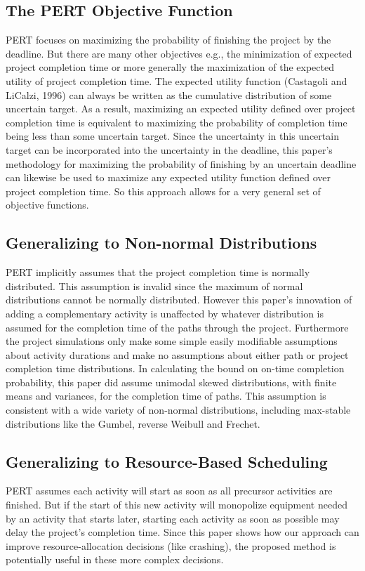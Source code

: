 \documentclass[11pt]{article}
\begin{document}
\subsection{The PERT Objective Function}
PERT focuses on maximizing the probability of finishing the project by the deadline.  But there are many other objectives e.g., the minimization of expected project completion time or more generally the maximization of the expected utility of project completion time.  The expected utility function (Castagoli and LiCalzi, 1996) can always be written as the cumulative distribution of some uncertain target.  As a result, maximizing an expected utility defined over project completion time is equivalent to maximizing the probability of completion time being less than some uncertain target.  Since the uncertainty in this uncertain target can be incorporated into the uncertainty in the deadline,  this paper's methodology for maximizing the probability of finishing by an uncertain deadline can likewise be used to maximize any expected utility function defined over project completion time.  So this approach allows for a very general set of objective functions.
\subsection{Generalizing to Non-normal Distributions}
  PERT implicitly assumes that the project completion time is normally distributed.  This assumption is invalid since the maximum of normal distributions cannot be normally distributed. However this paper's innovation of adding a complementary activity is unaffected by whatever distribution is assumed for the completion time of the paths through the project.  Furthermore the project simulations only make some simple easily modifiable assumptions about activity durations and make no assumptions about either path or project completion time distributions.  In calculating the bound on on-time completion probability, this paper did assume unimodal skewed distributions, with finite means and variances, for the completion time of paths. This assumption is consistent with a wide variety of non-normal distributions, including max-stable distributions like the Gumbel, reverse Weibull and Frechet.   \subsection{Generalizing to Resource-Based Scheduling}
PERT assumes each activity will start as soon as all precursor activities are finished.  But if the start of this new activity will monopolize equipment needed by an activity that starts later, starting each activity as soon as possible may delay the project's completion time.  Since this paper shows how our approach can improve resource-allocation decisions (like crashing), the proposed method is potentially useful in these more complex decisions.  \par
\end{document}
